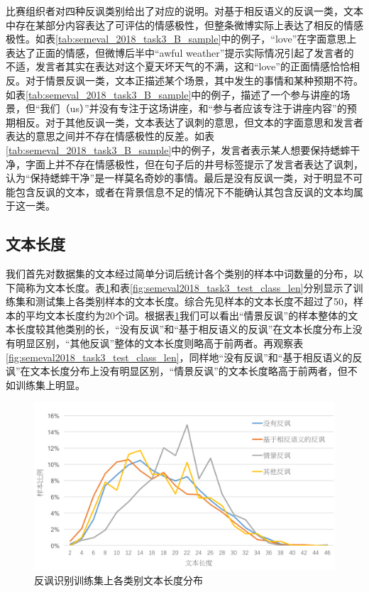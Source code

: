 比赛组织者对四种反讽类别给出了对应的说明。对基于相反语义的反讽一类，文本中存在某部分内容表达了可评估的情感极性，但整条微博实际上表达了相反的情感极性。如表\ref{tab:semeval_2018_task3_B_sample}中的例子，“love”在字面意思上表达了正面的情感，但微博后半中“awful weather”提示实际情况引起了发言者的不适，发言者其实在表达对这个夏天坏天气的不满，这和“love”的正面情感恰恰相反。对于情景反讽一类，文本正描述某个场景，其中发生的事情和某种预期不符。如表\ref{tab:semeval_2018_task3_B_sample}中的例子，描述了一个参与讲座的场景，但“我们（us）”并没有专注于这场讲座，和“参与者应该专注于讲座内容”的预期相反。对于其他反讽一类，文本表达了讽刺的意思，但文本的字面意思和发言者表达的意思之间并不存在情感极性的反差。如表\ref{tab:semeval_2018_task3_B_sample}中的例子，发言者表示某人想要保持蟋蟀干净，字面上并不存在情感极性，但在句子后的井号标签提示了发言者表达了讽刺，认为“保持蟋蟀干净”是一样莫名奇妙的事情。最后是没有反讽一类，对于明显不可能包含反讽的文本，或者在背景信息不足的情况下不能确认其包含反讽的文本均属于这一类。

\subsection{文本长度}

我们首先对数据集的文本经过简单分词后统计各个类别的样本中词数量的分布，以下简称为文本长度。表\ref{fig:semeval2018_task3_train_class_len}和表\ref{fig:semeval2018_task3_test_class_len}分别显示了训练集和测试集上各类别样本的文本长度。综合先见样本的文本长度不超过了50，样本的平均文本长度约为20个词。根据表\ref{fig:semeval2018_task3_train_class_len}我们可以看出“情景反讽”的样本整体的文本长度较其他类别的长，“没有反讽”和“基于相反语义的反讽”在文本长度分布上没有明显区别，“其他反讽”整体的文本长度则略高于前两者。再观察表\ref{fig:semeval2018_task3_test_class_len}，同样地“没有反讽”和“基于相反语义的反讽”在文本长度分布上没有明显区别，“情景反讽”的文本长度略高于前两者，但不如训练集上明显。

\begin{figure}[H]
  \centering
  \includegraphics[width=\textwidth]{img/semeval2018_task3_train_class_len.png}
  \caption{反讽识别训练集上各类别文本长度分布}
  \label{fig:semeval2018_task3_train_class_len}
\end{figure}

